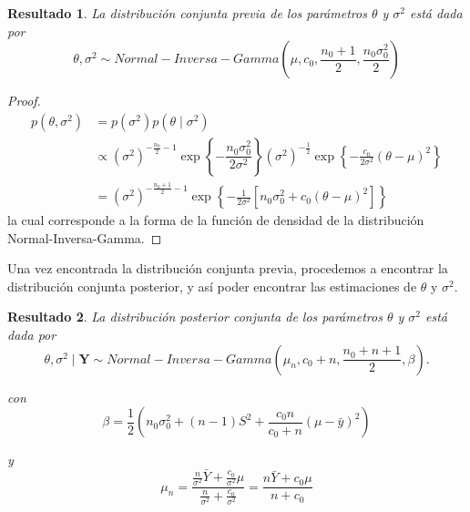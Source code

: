 \documentclass[
  10pt,
  spanish,
]{book}
\newtheorem{proposition}{Resultado}[chapter]
\theoremstyle{definition}
\theoremstyle{definition}
\theoremstyle{definition}
\theoremstyle{definition}
\theoremstyle{remark}
\begin{document}
\begin{proposition}
\protect\hypertarget{prp:unnamed-chunk-10}{}{\label{prp:unnamed-chunk-10} }La distribución conjunta previa de los parámetros \(\theta\) y \(\sigma^2\) está dada por
\begin{equation*}
\theta,\sigma^2 \sim Normal-Inversa-Gamma\left(\mu, c_0, \frac{n_0+1}{2},\frac{n_0\sigma^2_0}{2}\right)
\end{equation*}
\end{proposition}

\begin{proof}
{}\begin{align*}
p(\theta,\sigma^2)&=p(\sigma^2)p(\theta \mid \sigma^2)\\
&\propto (\sigma^2)^{-\frac{n_0}{2}-1}\exp\left\{-\dfrac{n_0\sigma_0^2}{2\sigma^2}\right\}
(\sigma^2)^{-\frac{1}{2}}\exp\left\{-\frac{c_0}{2\sigma^2}(\theta-\mu)^2\right\}\\
&= (\sigma^2)^{-\frac{n_0+1}{2}-1}\exp\left\{-\frac{1}{2\sigma^2}\left[n_0\sigma^2_0+c_0(\theta-\mu)^2\right]\right\}
\end{align*}
la cual corresponde a la forma de la función de densidad de la distribución Normal-Inversa-Gamma.
\end{proof}

Una vez encontrada la distribución conjunta previa, procedemos a encontrar la distribución conjunta posterior, y así poder encontrar las estimaciones de \(\theta\) y \(\sigma^2\).

\begin{proposition}
\protect\hypertarget{prp:unnamed-chunk-12}{}{\label{prp:unnamed-chunk-12} }La distribución posterior conjunta de los parámetros \(\theta\) y \(\sigma^2\) está dada por
\begin{equation*}
\theta,\sigma^2\mid\mathbf{Y} \sim Normal-Inversa-Gamma\left(\mu_n, c_0+n, \frac{n_0+n+1}{2},\beta \right).
\end{equation*}

con
\begin{equation*}
\beta=\dfrac{1}{2}\left(n_0\sigma^2_0+(n-1)S^2+\dfrac{c_0n}{c_0+n}(\mu-\bar{y})^2\right)
\end{equation*}

y
\begin{equation*}
\mu_n=\frac{\frac{n}{\sigma^2}\bar{Y}+\frac{c_0}{\sigma^2}\mu}{\frac{n}{\sigma^2}+\frac{c_0}{\sigma^2}}
=\frac{n\bar{Y}+c_0\mu}{n+c_0}
\end{equation*}
\end{proposition}
\end{document}
